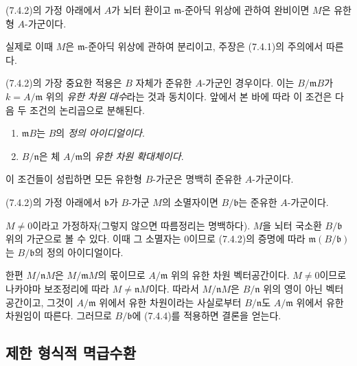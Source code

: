 \begin{corollary}[7.4.3]
\label{0.7.4.3-ko}
(7.4.2)의 가정 아래에서 $A$가 뇌터 환이고 $\mathfrak m$-준아딕
위상에 관하여 완비이면 $M$은 유한형 $A$-가군이다.
\end{corollary}

실제로 이때 $M$은 $\mathfrak m$-준아딕 위상에 관하여 분리이고,
주장은 (7.4.1)의 주의에서 따른다.

\begin{env}[7.4.4]
\label{0.7.4.4-ko}
(7.4.2)의 가장 중요한 적용은 $B$ 자체가 준유한 $A$-가군인
경우이다. 이는 $B/\mathfrak mB$가 $k=A/\mathfrak m$ 위의
\emph{유한 차원 대수}라는 것과 동치이다. 앞에서 본 바에 따라 이
조건은 다음 두 조건의 논리곱으로 분해된다.
\begin{enumerate}
  \item[(i)] $\mathfrak mB$는 $B$의 \emph{정의 아이디얼이다}.
  \item[(ii)] $B/\mathfrak n$은 체 $A/\mathfrak m$의
    \emph{유한 차원 확대체이다}.
\end{enumerate}
이 조건들이 성립하면 모든 유한형 $B$-가군은 명백히 준유한
$A$-가군이다.
\end{env}

\begin{corollary}[7.4.5]
\label{0.7.4.5-ko}
(7.4.2)의 가정 아래에서 $\mathfrak b$가 $B$-가군 $M$의
소멸자이면 $B/\mathfrak b$는 준유한 $A$-가군이다.
\end{corollary}

$M\neq0$이라고 가정하자(그렇지 않으면 따름정리는 명백하다).
$M$을 뇌터 국소환 $B/\mathfrak b$ 위의 가군으로 볼 수 있다. 이때
그 소멸자는 $0$이므로 (7.4.2)의 증명에 따라
$\mathfrak m(B/\mathfrak b)$는 $B/\mathfrak b$의 정의 아이디얼이다.

한편 $M/\mathfrak nM$은 $M/\mathfrak mM$의 몫이므로
$A/\mathfrak m$ 위의 유한 차원 벡터공간이다. $M\neq0$이므로
나카야마 보조정리에 따라 $M\neq\mathfrak nM$이다. 따라서
$M/\mathfrak nM$은 $B/\mathfrak n$ 위의 영이 아닌 벡터공간이고,
그것이 $A/\mathfrak m$ 위에서 유한 차원이라는 사실로부터
$B/\mathfrak n$도 $A/\mathfrak m$ 위에서 유한 차원임이 따른다.
그러므로 $B/\mathfrak b$에 (7.4.4)를 적용하면 결론을 얻는다.

\subsection{제한 형식적 멱급수환}
\label{subsection:0.7.5-ko}

